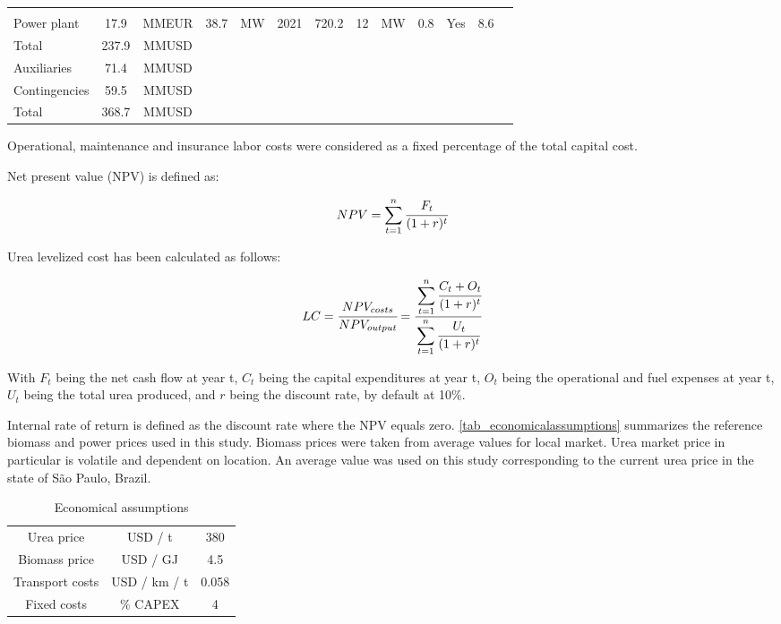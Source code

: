 \documentclass[a4paper, titlepage]{article}
\begin{document}
\begin{table}
\begin{tabular}{|| C{2.3cm} | c | c | c | c | C{1.4cm} | C{1.2cm} | c | c | C{0.9cm} | C{1.4cm} | C{1.5cm} | C{0.9cm} ||}
		\cite{swansonTechnoeconomicAnalysisBiomasstoliquids2010} \\
		Power plant & 17.9 & MMEUR & 38.7 & MW & 2021 & 720.2 & 12 & MW & 0.8 & Yes & 8.6 &
		\cite{cloeteCosteffectiveCleanAmmonia2021} \\
		\hline
		Total & 237.9 & MMUSD & & & & & & & & & & \\
		Auxiliaries & 71.4 & MMUSD & & & & & & & & & & \\
		Contingencies & 59.5 & MMUSD & & & & & & & & & & \\
		\hline
		Total & 368.7 & MMUSD & & & & & & & & & & \\
		\hline
	\end{tabular}

\end{table}

Operational, maintenance and insurance labor costs were considered as a fixed percentage of the total capital cost.

Net present value (NPV) is defined as:

\begin{equation}
	NPV = \sum_{t=1}^n \cfrac{F_t}{(1+r)^t}
\end{equation}

Urea levelized cost has been calculated as follows:

\begin{equation}
	LC = \cfrac{NPV_{costs}}{NPV_{output}} = \cfrac{\displaystyle\sum_{t=1}^n \cfrac{C_t + O_t}{(1+r)^t}}{\displaystyle\sum_{t=1}^n \cfrac{U_t}{(1+r)^t}}
\end{equation}

With $F_t$ being the net cash flow at year t, $C_t$ being the capital expenditures at year t, $O_t$ being the
operational and fuel expenses at year t, $U_t$ being the total urea produced, and $r$ being the discount rate,
by default at 10\%.

Internal rate of return is defined as the discount rate where the NPV equals zero.
\autoref{tab_economicalassumptions} summarizes the reference biomass and power prices used in this study. 
Biomass prices were taken from average values for local market. Urea market price in particular is volatile and 
dependent on location. An average value was used on this study corresponding to the current urea price in the state of
São Paulo, Brazil.

\begin{table}
	\centering
	\caption{Economical assumptions}
	\label{tab_economicalassumptions}
	\begin{tabular}{|c | c | c |}
		\hline
		Urea price & USD / t & 380 \\
		Biomass price & USD / GJ & 4.5 \\
		Transport costs & USD / km / t & 0.058 \\
		Fixed costs & \% CAPEX & 4 \\
	\hline	
	\end{tabular}
\end{table}
\end{document}
